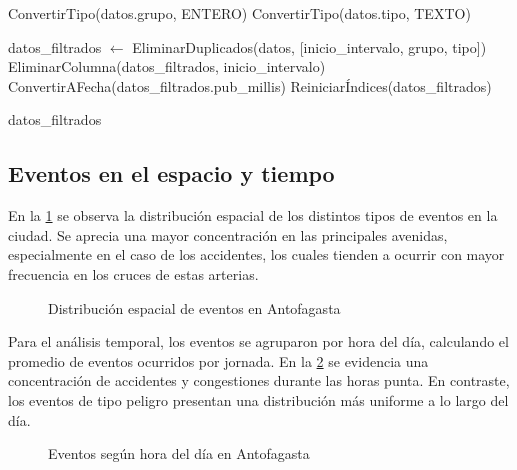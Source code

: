\documentclass[12pt]{article}
\begin{document}
{\begin{algorithm}
\begin{algorithmic}[1]
\State ConvertirTipo(datos.grupo, ENTERO)
\State ConvertirTipo(datos.tipo, TEXTO)

\State datos\_filtrados $\gets$ EliminarDuplicados(datos, [inicio\_intervalo, grupo, tipo])
\State EliminarColumna(datos\_filtrados, inicio\_intervalo)
\State ConvertirAFecha(datos\_filtrados.pub\_millis)
\State ReiniciarÍndices(datos\_filtrados)

\Return datos\_filtrados
\end{algorithmic}
\end{algorithm}


\subsection{Eventos en el espacio y tiempo}

En la \cref{fig:dist_events} se observa la distribución espacial de los distintos tipos de eventos en la ciudad. Se aprecia una mayor concentración en las principales avenidas, especialmente en el caso de los accidentes, los cuales tienden a ocurrir con mayor frecuencia en los cruces de estas arterias.

\begin{figure}[H]
    \centering
    \caption{Distribución espacial de eventos en Antofagasta}
    \label{fig:dist_events}
\end{figure}

Para el análisis temporal, los eventos se agruparon por hora del día, calculando el promedio de eventos ocurridos por jornada. En la \cref{fig:time_events} se evidencia una concentración de accidentes y congestiones durante las horas punta. En contraste, los eventos de tipo peligro presentan una distribución más uniforme a lo largo del día.

\begin{figure}[H]
    \centering
    \newline
    \newline
    \newline
    \caption{Eventos según hora del día en Antofagasta}
    \label{fig:time_events}
\end{figure}

}
\end{document}
